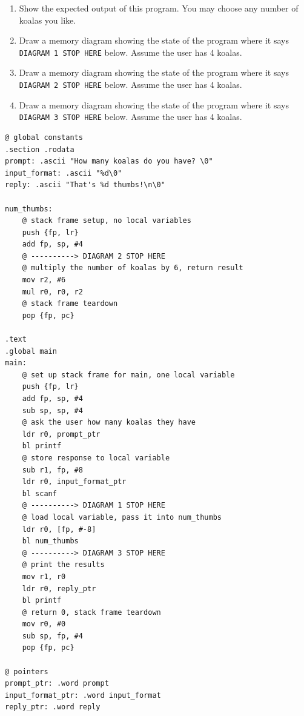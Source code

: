 \documentclass[12pt]{article}
\begin{document}
\begin{enumerate}

\item Show the expected output of this program. You may choose any number of koalas you like.
\vfill

\item Draw a memory diagram showing the state of the program where it says \texttt{DIAGRAM 1 STOP HERE} below. Assume the user has 4 koalas. 
\vfill
\vfill
\vfill

\newpage


\item Draw a memory diagram showing the state of the program where it says \texttt{DIAGRAM 2 STOP HERE} below. Assume the user has 4 koalas. 
\vfill

\item Draw a memory diagram showing the state of the program where it says \texttt{DIAGRAM 3 STOP HERE} below. Assume the user has 4 koalas. 
\vfill

\end{enumerate}

\newpage 


\begin{verbatim}
@ global constants
.section .rodata
prompt: .ascii "How many koalas do you have? \0"
input_format: .ascii "%d\0"
reply: .ascii "That's %d thumbs!\n\0"

num_thumbs:
    @ stack frame setup, no local variables
    push {fp, lr}
    add fp, sp, #4
    @ ----------> DIAGRAM 2 STOP HERE
    @ multiply the number of koalas by 6, return result
    mov r2, #6
    mul r0, r0, r2
    @ stack frame teardown
    pop {fp, pc}

.text
.global main
main: 
    @ set up stack frame for main, one local variable
    push {fp, lr}
    add fp, sp, #4
    sub sp, sp, #4
    @ ask the user how many koalas they have
    ldr r0, prompt_ptr
    bl printf
    @ store response to local variable
    sub r1, fp, #8
    ldr r0, input_format_ptr
    bl scanf
    @ ----------> DIAGRAM 1 STOP HERE
    @ load local variable, pass it into num_thumbs
    ldr r0, [fp, #-8]
    bl num_thumbs    
    @ ----------> DIAGRAM 3 STOP HERE
    @ print the results
    mov r1, r0
    ldr r0, reply_ptr
    bl printf
    @ return 0, stack frame teardown
    mov r0, #0
    sub sp, fp, #4
    pop {fp, pc}

@ pointers
prompt_ptr: .word prompt
input_format_ptr: .word input_format
reply_ptr: .word reply
\end{verbatim}



\vfill

\standardsfooter

\end{document}
